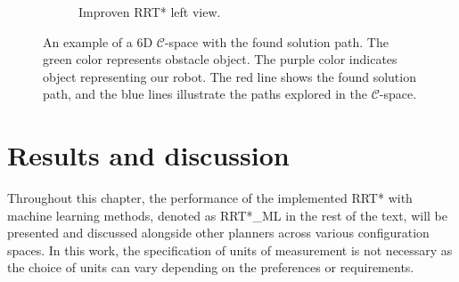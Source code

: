 \documentclass{ctuthesis}
\begin{document}
\begin{figure}[!ht]
\begin{subfigure}[b]{0.49\textwidth}
    \caption{Improven RRT* left view.}
    \label{fig:rrtstarML3D_maze_top}
\end{subfigure}
  \caption{An example of a 6D $\mathcal{C}$-space with the found solution path. 
  The green color represents obstacle object. 
  The purple color indicates object representing our robot. 
  The red line shows the found solution path, 
  and the blue lines illustrate the paths explored in the $\mathcal{C}$-space.}
  \label{fig:6Dconfig-space}
\end{figure}
\chapter{Results and discussion} 
\label{chap:Result} 
Throughout this chapter, 
the performance of the implemented RRT* with machine learning methods, 
denoted as RRT*\_ML in the rest of the text,
will be presented and discussed 
alongside other planners across various configuration spaces. 
In this work, the specification of units of measurement is not necessary 
as the choice of units can vary depending on the preferences or requirements.
\end{document}
